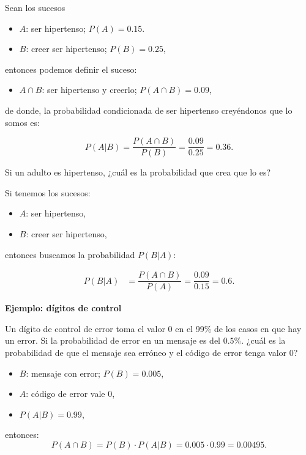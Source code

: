 \documentclass[
  letterpaper,
  DIV=11,
  numbers=noendperiod]{scrreprt}
\providecommand{\tightlist}{%
  \setlength{\itemsep}{0pt}\setlength{\parskip}{0pt}}\usepackage{longtable,booktabs,array}
\begin{document}
Sean los sucesos

\begin{itemize}
\tightlist
\item
  \(A\): ser hipertenso; \(P(A)=0.15\).
\item
  \(B\): creer ser hipertenso; \(P(B)=0.25\),
\end{itemize}

entonces podemos definir el suceso:

\begin{itemize}
\tightlist
\item
  \(A\cap B\): ser hipertenso y creerlo; \(P(A\cap B)=0.09\),
\end{itemize}

de donde, la probabilidad condicionada de ser hipertenso creyéndonos que
lo somos es:

\[P(A|B)=\dfrac{P(A\cap B)}{P(B)}=\dfrac{0.09}{0.25}=0.36.\]

Si un adulto es hipertenso, ¿cuál es la probabilidad que crea que lo es?

Si tenemos los sucesos:

\begin{itemize}
\tightlist
\item
  \(A\): ser hipertenso,
\item
  \(B\): creer ser hipertenso,
\end{itemize}

entonces buscamos la probabilidad \(P(B|A)\):

\[
\begin{array}{rl}
P(B|A) & =\dfrac{P(A\cap B)}{P(A)}=\dfrac{0.09}{0.15}=
0.6.
\end{array}
\]

\textbf{Ejemplo: dígitos de control}

Un dígito de control de error toma el valor 0 en el 99\% de los casos en
que hay un error. Si la probabilidad de error en un mensaje es del
\(0.5\%\). ¿cuál es la probabilidad de que el mensaje sea erróneo y el
código de error tenga valor 0?

\begin{itemize}
\tightlist
\item
  \(B\): mensaje con error; \(P(B)=0.005\),
\item
  \(A\): código de error vale 0,
\item
  \(P(A|B)=0.99\),
\end{itemize}

entonces: \[P(A\cap B)=P(B)\cdot P(A|B)=0.005\cdot 0.99=0.00495.\]
\end{document}
